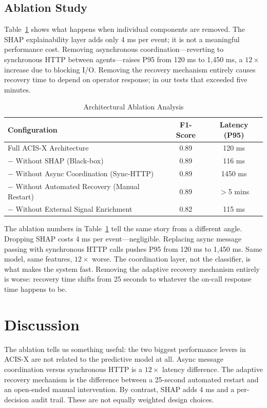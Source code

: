 \documentclass[runningheads]{llncs}
\begin{document}
\subsection{Ablation Study}
Table~\ref{tab:ablation} shows what happens when individual components are removed. The SHAP explainability layer adds only 4 ms per event; it is not a meaningful performance cost. Removing asynchronous coordination---reverting to synchronous HTTP between agents---raises P95 from 120 ms to 1,450 ms, a $12\times$ increase due to blocking I/O. Removing the recovery mechanism entirely causes recovery time to depend on operator response; in our tests that exceeded five minutes.

\begin{table}[ht]
\centering
\caption{Architectural Ablation Analysis}
\label{tab:ablation}
\begin{tabular}{@{}lcc@{}}
\toprule
\textbf{Configuration} & \textbf{F1-Score} & \textbf{Latency (P95)} \\ \midrule
Full ACIS-X Architecture & 0.89 & 120 ms \\
$-$ Without SHAP (Black-box) & 0.89 & 116 ms \\
$-$ Without Async Coordination (Sync-HTTP) & 0.89 & 1450 ms \\
$-$ Without Automated Recovery (Manual Restart) & 0.89 & $>$5 mins \\
$-$ Without External Signal Enrichment & 0.82 & 115 ms \\ \bottomrule
\end{tabular}
\end{table}

The ablation numbers in Table~\ref{tab:ablation} tell the same story from a different angle. Dropping SHAP costs 4 ms per event---negligible. Replacing async message passing with synchronous HTTP calls pushes P95 from 120 ms to 1,450 ms. Same model, same features, $12\times$ worse. The coordination layer, not the classifier, is what makes the system fast. Removing the adaptive recovery mechanism entirely is worse: recovery time shifts from 25 seconds to whatever the on-call response time happens to be.

\section{Discussion}

The ablation tells us something useful: the two biggest performance levers in ACIS-X are not related to the predictive model at all. Async message coordination versus synchronous HTTP is a $12\times$ latency difference. The adaptive recovery mechanism is the difference between a 25-second automated restart and an open-ended manual intervention. By contrast, SHAP adds 4 ms and a per-decision audit trail. These are not equally weighted design choices.
\end{document}
